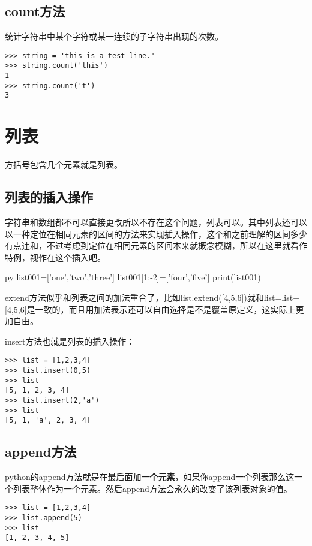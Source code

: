 \documentclass[12pt,oneside]{book}
\begin{document}
\begin{common-format}
\subsection{count方法}
统计字符串中某个字符或某一连续的子字符串出现的次数。
\begin{Verbatim}
>>> string = 'this is a test line.'
>>> string.count('this')
1
>>> string.count('t')
3
\end{Verbatim}


\section{列表}
方括号包含几个元素就是列表。


\subsection{列表的插入操作}
\label{sec:列表插入操作}
字符串和数组都不可以直接更改所以不存在这个问题，列表可以。其中列表还可以以一种定位在相同元素的区间的方法来实现插入操作，这个和之前理解的区间多少有点违和，不过考虑到定位在相同元素的区间本来就概念模糊，所以在这里就看作特例，视作在这个插入吧。
\begin{xverbatim}[129]{py}
list001=['one','two','three']
list001[1:-2]=['four','five']
print(list001)
\end{xverbatim}

extend方法似乎和列表之间的加法重合了，比如list.extend([4,5,6])就和list=list+[4,5,6]是一致的，而且用加法表示还可以自由选择是不是覆盖原定义，这实际上更加自由。

insert方法也就是列表的插入操作：
\begin{Verbatim}
>>> list = [1,2,3,4]
>>> list.insert(0,5)
>>> list
[5, 1, 2, 3, 4]
>>> list.insert(2,'a')
>>> list
[5, 1, 'a', 2, 3, 4]
\end{Verbatim}


\subsection{append方法}
python的append方法就是在最后面加\textbf{一个元素}，如果你append一个列表那么这一个列表整体作为一个元素。然后append方法会永久的改变了该列表对象的值。

\begin{Verbatim}
>>> list = [1,2,3,4]
>>> list.append(5)
>>> list
[1, 2, 3, 4, 5]
\end{Verbatim}


\end{common-format}
\end{document}
